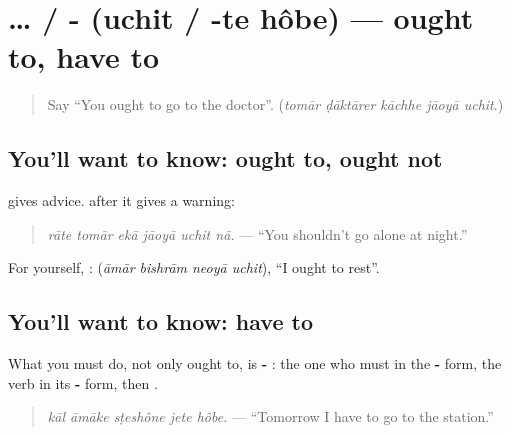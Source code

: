 \section[\texorpdfstring{… \bn{উচিত} / -\bn{তে} \bn{হবে} (… uchit / -te hôbe)}{… উচিত / -তে হবে (… uchit / -te hôbe)}]{…  / -  (uchit / -te hôbe) — ought to, have to}

\label{lesson:BN-C269-uchit-te-hobe}



\begin{quote}
Say \textquotedblleft{}You ought to go to the doctor\textquotedblright{}. (\emph{tomār ḍāktārer kāchhe jāoyā uchit}.)
\end{quote}

\subsection*{You'll want to know: ought to, ought not}
\textbf{} gives advice. \textbf{} after it gives a warning:

\begin{quote}
\textbf{     }
\end{quote}

\begin{quote}
\emph{rāte tomār ekā jāoyā uchit nā.} — \textquotedblleft{}You shouldn't go alone at night.\textquotedblright{}
\end{quote}

For yourself, \textbf{}: \textbf{   } (\emph{āmār bishrām neoyā uchit}), \textquotedblleft{}I ought to rest\textquotedblright{}.

\subsection*{You'll want to know: have to}
What you must do, not only ought to, is \textbf{- }: the one who must in the \textbf{-} form, the verb in its \textbf{-} form, then \textbf{}.

\begin{quote}
\textbf{    }
\end{quote}

\begin{quote}
\emph{kāl āmāke sṭeshône jete hôbe.} — \textquotedblleft{}Tomorrow I have to go to the station.\textquotedblright{}
\end{quote}

